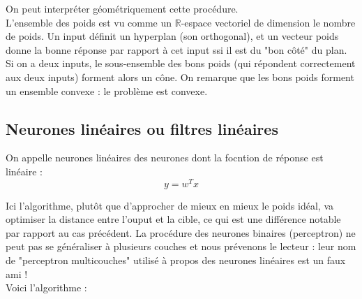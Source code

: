 \documentclass{article}
\theoremstyle{definition}
\newtheorem{dem}{Preuve}
\newcommand{\R}{\mathbb R}
\begin{document}
On peut interpréter géométriquement cette procédure.\\

L'ensemble des poids est vu comme un $\R$-espace vectoriel de dimension le nombre de poids. Un input définit un hyperplan (son orthogonal), et un vecteur poids donne la bonne réponse par rapport à cet input ssi il est du "bon côté" du plan. Si on a deux inputs, le sous-ensemble des bons poids (qui répondent correctement aux deux inputs) forment alors un cône. On remarque que les bons poids forment un ensemble convexe : le problème est convexe.\\


\subsection{Neurones linéaires ou filtres linéaires}
On appelle neurones linéaires des neurones dont la focntion de réponse est linéaire :
\[y=w^Tx\]

Ici l'algorithme, plutôt que d'approcher de mieux en mieux le poids idéal, va optimiser la distance entre l'ouput et la cible, ce qui est une différence notable par rapport au cas précédent. La procédure des neurones binaires (perceptron) ne peut pas se généraliser à plusieurs couches et nous prévenons le lecteur : leur nom de "perceptron multicouches" utilisé à propos des neurones linéaires est un faux ami ! \\

Voici l'algorithme :\\

\\
\\
\end{document}
